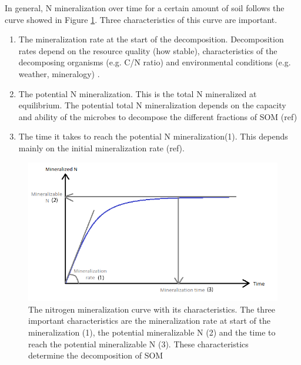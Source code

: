 \documentclass[10pt,twoside,dutch,english]{report}
\begin{document}
In general, N mineralization over time for a certain amount of soil  follows the curve showed in Figure \ref{fig:intro_Ncum}. Three characteristics of this curve are important. 
\begin{enumerate}
	\item The mineralization rate at the start of the decomposition. Decomposition rates depend on the resource quality (how stable), characteristics of the decomposing organisms (e.g. C/N ratio) and environmental conditions (e.g. weather, mineralogy) \citep{Lavelle1993}. 
	\item The potential N mineralization. This is the total N mineralized at equilibrium. The potential total N mineralization depends on the capacity and ability of the microbes to decompose the different fractions of SOM (ref)
	\item The time it takes to reach the potential N mineralization(1). This depends mainly on the initial mineralization rate (ref).
\end{enumerate}


\begin{figure}[h]
	\includegraphics[width=1\linewidth]{intro_Ncum}
	\caption{The nitrogen mineralization curve with its characteristics. The three important characteristics are the mineralization rate at start of the mineralization (1), the potential mineralizable N (2) and the time to reach the potential mineralizable N (3). These characteristics determine the decomposition of SOM}
	\label{fig:intro_Ncum}
\end{figure}
\end{document}
